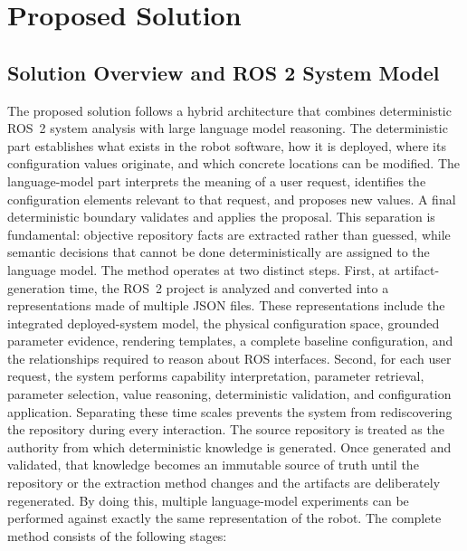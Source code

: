\chapter{Proposed Solution}
\section{Solution Overview and ROS 2 System Model}
The proposed solution follows a hybrid architecture that combines deterministic ROS~2 system analysis with large language model reasoning. The deterministic part establishes what exists in the robot software, how it is deployed, where its configuration values originate, and which concrete locations can be modified. The language-model part interprets the meaning of a user request, identifies the configuration elements relevant to that request, and proposes new values. A final deterministic boundary validates and applies the proposal. This separation is fundamental: objective repository facts are extracted rather than guessed, while semantic decisions that cannot be done deterministically are assigned to the language model.
The method operates at two distinct steps. First, at artifact-generation time, the ROS~2 project is analyzed and converted into a representations made of multiple JSON files. These representations include the integrated deployed-system model, the physical configuration space, grounded parameter evidence, rendering templates, a complete baseline configuration, and the relationships required to reason about ROS interfaces. Second, for each user request, the system performs capability interpretation, parameter retrieval, parameter selection, value reasoning, deterministic validation, and configuration application.
Separating these time scales prevents the system from rediscovering the repository during every interaction. The source repository is treated as the authority from which deterministic knowledge is generated. Once generated and validated, that knowledge becomes an immutable source of truth until the repository or the extraction method changes and the artifacts are deliberately regenerated. By doing this, multiple language-model experiments can be performed against exactly the same representation of the robot. The complete method consists of the following stages:

